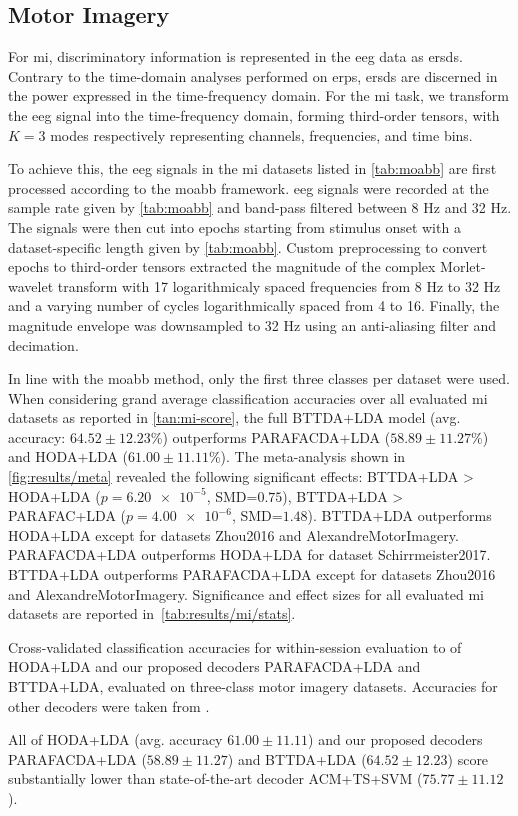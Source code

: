 \documentclass[twocolumn]{article}
\begin{document}
\subsection{Motor Imagery}

For \ac{mi}, discriminatory information is represented in the \ac{eeg} data as
\acp{ersd}.
Contrary to the time-domain analyses performed on \acp{erp}, \acp{ersd} are
discerned in the power expressed in the time-frequency domain.
For the \ac{mi} task, we transform the \ac{eeg} signal into the
time-frequency domain, forming third-order tensors, with $K=3$ modes
respectively representing channels, frequencies, and time bins.

To achieve this, the \ac{eeg} signals in the \ac{mi} datasets listed in \cref{tab:moabb}
are first processed according to the \ac{moabb} framework.
\ac{eeg} signals were recorded at the sample rate given
by \cref{tab:moabb} and band-pass filtered between 8 Hz
and 32 Hz.
The signals were then cut into epochs starting from stimulus onset with a
dataset-specific length given by \cref{tab:moabb}.
Custom preprocessing to convert epochs to third-order tensors extracted
the magnitude of the complex Morlet-wavelet transform with 17 logarithmicaly spaced frequencies from 8 Hz to 32 Hz and a varying number of cycles logarithmically spaced from 4 to 16.
Finally, the magnitude envelope was downsampled to 32 Hz using an anti-aliasing
filter and decimation.

In line with the \ac{moabb} method, only the first three classes per dataset were
used.
When considering grand average classification accuracies over all evaluated
\ac{mi} datasets as reported in \cref{tan:mi-score},
the full BTTDA+LDA model (avg. accuracy: $64.52\pm12.23$\%)
outperforms PARAFACDA+LDA ($58.89\pm11.27$\%) and HODA+LDA
($61.00\pm11.11$\%).
The meta-analysis shown in \cref{fig:results/meta} revealed the following significant effects:
BTTDA+LDA > HODA+LDA ($p=\num{6.20e-5}$, SMD=$0.75$),
BTTDA+LDA > PARAFAC+LDA ($p=\num{4.00e-6}$, SMD=$1.48$).
BTTDA+LDA outperforms HODA+LDA except for datasets Zhou2016 and AlexandreMotorImagery.
PARAFACDA+LDA outperforms HODA+LDA for dataset Schirrmeister2017.
BTTDA+LDA outperforms PARAFACDA+LDA except for datasets Zhou2016 and AlexandreMotorImagery.
Significance and effect sizes for all evaluated \ac{mi} datasets are reported in~\cref{tab:results/mi/stats}.

\begin{sidewaystable*}
	\footnotesize
	
	\caption{Cross-validated classification accuracies for within-session evaluation
		to
		of HODA+LDA and our proposed decoders	PARAFACDA+LDA and BTTDA+LDA,
		evaluated on three-class motor imagery datasets.
		Accuracies for other decoders were taken from \textcite{Chevallier2024}.}%
	\label{tab:mi-score}%
\end{sidewaystable*}
All of HODA+LDA (avg. accuracy $61.00\pm11.11$) and our proposed decoders PARAFACDA+LDA
($58.89\pm11.27$) and BTTDA+LDA ($64.52\pm12.23$) score
substantially lower than state-of-the-art decoder ACM+TS+SVM ($75.77\pm11.12$).
\end{document}
